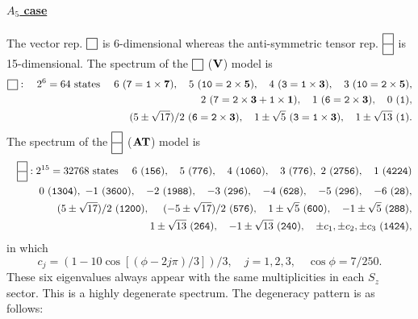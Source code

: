 \documentclass[a4paper,12pt]{article}
\def\sqr#1#2{{\vcenter{\hrule height.#2pt
      \hbox{\vrule width.#2pt height#1pt \kern#1pt
          \vrule width.#2pt}
      \hrule height.#2pt}}}
\def\twosqr#1#2{{\vcenter{\hrule height.#2pt
      \hbox{\vrule width.#2pt height#1pt \kern#1pt
          \vrule width.#2pt}
      \hrule height.#2pt
      \hbox{\vrule width.#2pt height#1pt \kern#1pt
          \vrule width.#2pt}
      \hrule height.#2pt}}}
\begin{document}
\paragraph{\underline{$A_5$ case}} The vector rep.
$\sqr{9}5$ is 6-dimensional
whereas the anti-symmetric tensor rep. $\twosqr{9}5$ is 15-dimensional.
The spectrum of the $\sqr{9}5$ (${\bf V}$) model is
\begin{eqnarray}
{\sqr{9}5}:\quad 2^6=64\ \mbox{states}\ &&
6\ ({\tt 7}={\tt 1}\times{\bf 7}),
\quad 5\ ({\tt 10}={\tt2}\times{\bf5}), \quad 4\
({\tt 3}={\tt1}\times{\bf3}),
\quad 3\ ({\tt 10}={\tt2}\times{\bf5}),\nonumber\\
&&\ 2\ ({\tt 7}={\tt2}\times{\bf3}+{\tt1}\times{\bf1}), \quad 1\ ({\tt
6}={\tt2}\times{\bf3}),
\quad 0\ ({\tt 1}),
\label{a5v}\\
&&\ (5\pm\sqrt{17})/2\ ({\tt 6}={\tt2}\times{\bf3}),
\quad 1\pm\sqrt{5}\ ({\tt
3}={\tt1}\times{\bf3}),
\quad 1\pm\sqrt{13}\ ({\tt 1}).\nonumber
\end{eqnarray}
The spectrum of the $\twosqr{9}5$ (${\bf AT}$) model is
\begin{eqnarray}
&&{\twosqr{9}5}: 2^{15}=32768\ \mbox{states}\ \quad
6\ ({\tt 156}), \quad 5\ ({\tt 776}), \quad 4\
({\tt 1060}),
\quad 3\ ({\tt 776}),
\ 2\ ({\tt 2756}), \quad 1\ ({\tt 4224})\nonumber\\
&& \quad 0\ ({\tt 1304}),
\ -1\ ({\tt 3600}), \quad -2\ ({\tt
1988}),
\quad -3\ ({\tt  296}),\quad -4\ ({\tt 628}),
\quad -5\ ({\tt 296}),\quad -6\ ({\tt 28}),
\nonumber\\
&&\ (5\pm\sqrt{17})/2\ ({\tt 1200}),\quad \ (-5\pm\sqrt{17})/2\
({\tt 576}), \quad 1\pm\sqrt{5}\ ({\tt
600}),\quad -1\pm\sqrt{5}\ ({\tt 288}),
\nonumber\\
&&\quad 1\pm\sqrt{13}\ ({\tt 264}),
\quad -1\pm\sqrt{13}\ ({\tt 240}), \quad \pm c_1,
\pm c_2, \pm c_3\ ({\tt 1424}),
\end{eqnarray}
in which
\begin{equation}
c_j=\left(1-10\cos[(\phi-2j\pi)/3]\right)/3,\quad j=1,2,3,
\quad \cos\phi={7/{250}}.
\end{equation}
These six eigenvalues always appear with the same
multiplicities in each $S_z$ sector.
This is a highly degenerate spectrum.
The degeneracy pattern is as follows:
\end{document}
